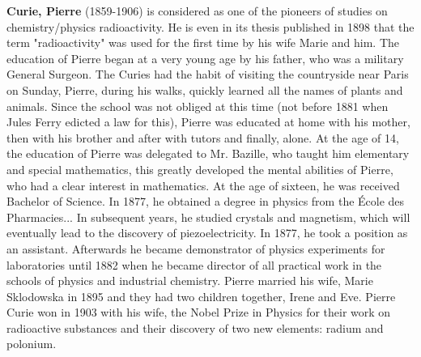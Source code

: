 \textbf{Curie, Pierre} (1859-1906) is considered as one of the pioneers of studies on chemistry/physics radioactivity. He is even in its thesis published in 1898 that the term "radioactivity" was used for the first time by his wife Marie and him. The education of Pierre began at a very young age by his father, who was a military General Surgeon. The Curies had the habit of visiting the countryside near Paris on Sunday, Pierre, during his walks, quickly learned all the names of plants and animals. Since the school was not obliged at this time (not before 1881 when Jules Ferry edicted a law for this), Pierre was educated at home with his mother, then with his brother and after with tutors and finally, alone. At the age of 14, the education of Pierre was delegated to Mr. Bazille, who taught him elementary and special mathematics, this greatly developed the mental abilities of Pierre, who had a clear interest in mathematics. At the age of sixteen, he was received Bachelor of Science. In 1877, he obtained a degree in physics from the École des Pharmacies... In subsequent years, he studied crystals and magnetism, which will eventually lead to the discovery of piezoelectricity. In 1877, he took a position as an assistant. Afterwards he became demonstrator of physics experiments for laboratories until 1882 when he became director of all practical work in the schools of physics and industrial chemistry. Pierre married his wife, Marie Sklodowska in 1895 and they had two children together, Irene and Eve. Pierre Curie won in 1903 with his wife, the Nobel Prize in Physics for their work on radioactive substances and their discovery of two new elements: radium and polonium.

